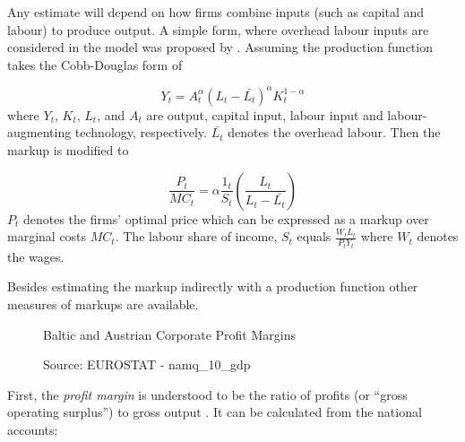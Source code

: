 \documentclass[twoside]{article}
\begin{document}
\begin{multicols}{2}
Any estimate will depend on how firms combine inputs (such as capital and labour) to produce output. A simple form, where overhead labour inputs are considered in the model was proposed by \cite{Rotemberg1991Markups}. Assuming the production function takes the Cobb-Douglas form of



\begin{equation}
 Y_{t}=A_{t}^\alpha(L_{t}-\bar{L_{t}})^\alpha  K_{t}^{1-\alpha}
\end{equation}
where $Y_{t}$, $K_{t}$, $L_{t}$,  and $A_{t}$ are output, capital input, labour input and labour-augmenting technology, respectively. $\bar{L_{t}}$ denotes the overhead labour. Then the markup is modified to

\begin{equation}
 \frac{P_{t}}{MC_{t}} = \alpha \frac{1_{t}}{S_{t}}(\frac{L_{t}}{L_{t}-\bar{L_{t}}})
\end{equation}
$P_{t}$ denotes the firms' optimal price which can be expressed as a markup over marginal costs $MC_{t}$. The labour share of income, $S_{t}$ equals $\frac{W_{t}L_{t}}{P_{t}Y_{t}}$ where $W_{t}$ denotes the wages. 

Besides estimating the markup indirectly with a production function other measures of markups are available.

\begin{figure}[H]
\centering
\resizebox{10cm}{!}{}
\vspace*{-10mm}
\caption{Baltic and Austrian Corporate Profit Margins}\label{fig:Corporate Profit Margins}
\vspace*{-4mm} %
\caption*{Source: EUROSTAT - namq\_10\_gdp}
\end{figure}


First, the \textit{profit margin} is understood to be the ratio of profits (or ``gross operating surplus'') to gross output . It can be calculated from the national accounts: 





\end{multicols}
\end{document}
